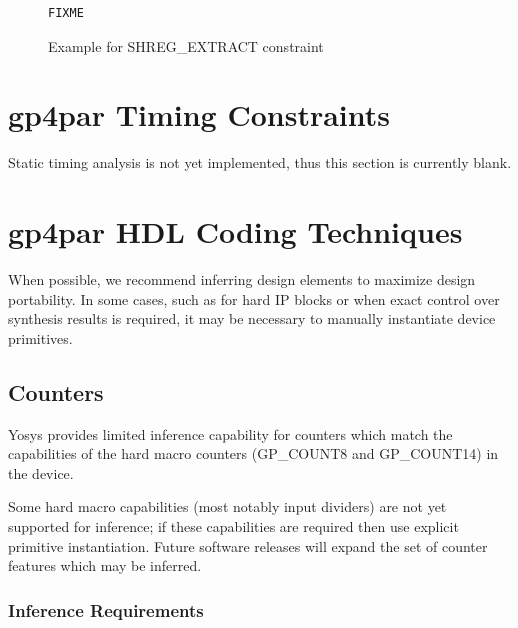 \documentclass{article}
\begin{document}
\begin{figure}[h]
\begin{lstlisting}
FIXME
\end{lstlisting}
\caption{Example for SHREG\_EXTRACT constraint}
\label{constraint-shreg-extract}
\end{figure}


\pagebreak
\section{gp4par Timing Constraints}

Static timing analysis is not yet implemented, thus this section is currently blank.


\pagebreak
\section{gp4par HDL Coding Techniques}

When possible, we recommend inferring design elements to maximize design portability. In some cases, such as for hard 
IP blocks or when exact control over synthesis results is required, it may be necessary to manually instantiate device 
primitives.


\subsection{Counters}

Yosys provides limited inference capability for counters which match the capabilities of the hard macro counters 
(GP\_COUNT8 and GP\_COUNT14) in the device.

Some hard macro capabilities (most notably input dividers) are not yet supported for inference; if these capabilities 
are required then use explicit primitive instantiation. Future software releases will expand the set of counter 
features which may be inferred.

\subsubsection{Inference Requirements}
\end{document}

